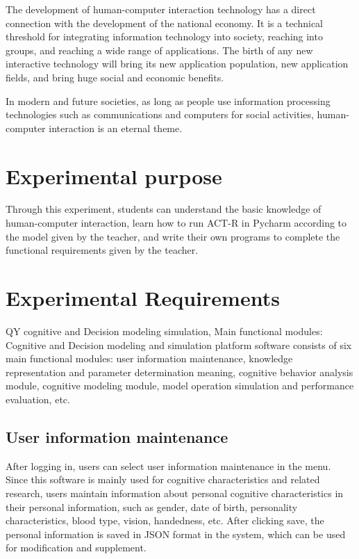 \documentclass[twoside,11pt]{article}
\begin{document}
The development of human-computer interaction technology has a direct connection with the development of the national economy. It is a technical threshold for integrating information technology into society, reaching into groups, and reaching a wide range of applications. The birth of any new interactive technology will bring its new application population, new application fields, and bring huge social and economic benefits.


In modern and future societies, as long as people use information processing technologies such as communications and computers for social activities, human-computer interaction is an eternal theme.

\section{Experimental purpose}
\label{sec:background}


Through this experiment, students can understand the basic knowledge of human-computer interaction, learn how to run ACT-R in Pycharm according to the model given by the teacher, and write their own programs to complete the functional requirements given by the teacher.


\section{Experimental Requirements}
\label{rt}

QY cognitive and Decision modeling simulation, Main functional modules: 
Cognitive and Decision modeling and simulation platform software consists of six main functional modules: user information maintenance, knowledge representation and parameter determination meaning, cognitive behavior analysis module, cognitive modeling module, model operation simulation and performance evaluation, etc.

\subsection{User information maintenance}


After logging in, users can select user information maintenance in the menu. Since this software is mainly used for cognitive characteristics and related research, users maintain information about personal cognitive characteristics in their personal information, such as gender, date of birth, personality characteristics, blood type, vision, handedness, etc. After clicking save, the personal information is saved in JSON format in the system, which can be used for modification and supplement.
\end{document}
